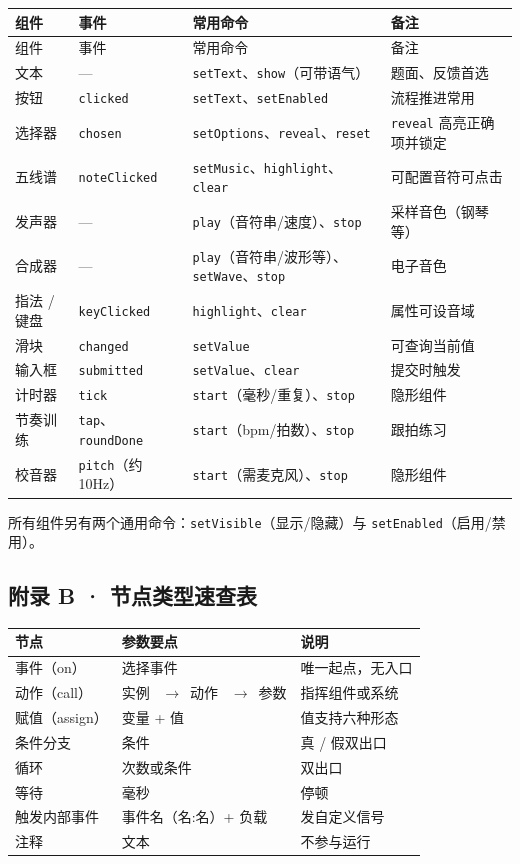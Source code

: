 \documentclass[UTF8,a4paper,zihao=-4]{ctexart}
\newcommand{\code}[1]{\texttt{#1}}   %
\newcommand{\ra}{\ $\rightarrow$\ }  %
\begin{document}
\begin{center}
\footnotesize
\setlength{\tabcolsep}{4pt}
\begin{longtable}{llll}
\toprule
组件 & 事件 & 常用命令 & 备注 \\
\midrule
\endfirsthead
\toprule
组件 & 事件 & 常用命令 & 备注 \\
\midrule
\endhead
文本 & — & \code{setText}、\code{show}（可带语气） & 题面、反馈首选 \\
按钮 & \code{clicked} & \code{setText}、\code{setEnabled} & 流程推进常用 \\
选择器 & \code{chosen} & \code{setOptions}、\code{reveal}、\code{reset} & \code{reveal} 高亮正确项并锁定 \\
五线谱 & \code{noteClicked} & \code{setMusic}、\code{highlight}、\code{clear} & 可配置音符可点击 \\
发声器 & — & \code{play}（音符串/速度）、\code{stop} & 采样音色（钢琴等） \\
合成器 & — & \code{play}（音符串/波形等）、\code{setWave}、\code{stop} & 电子音色 \\
指法 / 键盘 & \code{keyClicked} & \code{highlight}、\code{clear} & 属性可设音域 \\
滑块 & \code{changed} & \code{setValue} & 可查询当前值 \\
输入框 & \code{submitted} & \code{setValue}、\code{clear} & 提交时触发 \\
计时器 & \code{tick} & \code{start}（毫秒/重复）、\code{stop} & 隐形组件 \\
节奏训练 & \code{tap}、\code{roundDone} & \code{start}（bpm/拍数）、\code{stop} & 跟拍练习 \\
校音器 & \code{pitch}（约 10Hz） & \code{start}（需麦克风）、\code{stop} & 隐形组件 \\
\bottomrule
\end{longtable}
\end{center}

所有组件另有两个通用命令：\code{setVisible}（显示/隐藏）与 \code{setEnabled}（启用/禁用）。

\subsection*{附录 B · 节点类型速查表}

\begin{center}
\begin{tabular}{lll}
\toprule
节点 & 参数要点 & 说明 \\
\midrule
事件（on） & 选择事件 & 唯一起点，无入口 \\
动作（call） & 实例 \ra 动作 \ra 参数 & 指挥组件或系统 \\
赋值（assign） & 变量 + 值 & 值支持六种形态 \\
条件分支 & 条件 & 真 / 假双出口 \\
循环 & 次数或条件 & 双出口 \\
等待 & 毫秒 & 停顿 \\
触发内部事件 & 事件名（名:名）+ 负载 & 发自定义信号 \\
注释 & 文本 & 不参与运行 \\
\bottomrule
\end{tabular}
\end{center}
\end{document}
